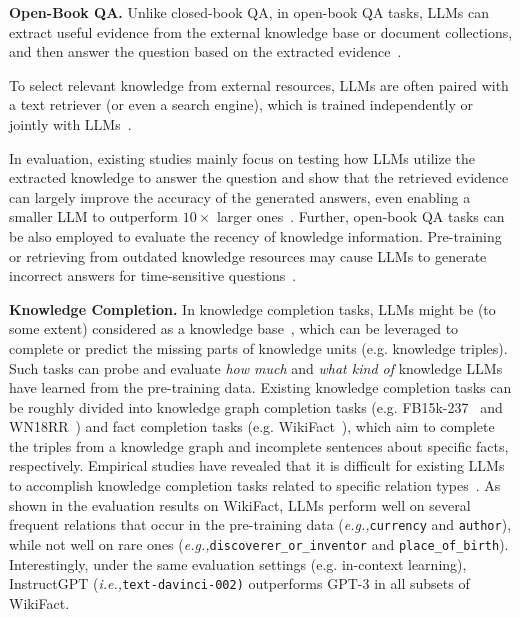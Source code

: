 {{{{{\textbf{Open-Book QA.} Unlike closed-book QA, in open-book QA tasks, LLMs can extract useful evidence from the external knowledge base or document collections,  and then answer the question based on the extracted evidence~\cite{Izacard-arxiv-2022-Few, Guu-ICML-2020-Retrieval, Lewis-NeurIPS-2020-Retrieval,Lan-2021-arxiv-Complex}. 

To select relevant knowledge from external resources, LLMs are often paired with a text retriever (or even a  search engine), which is trained independently or jointly with LLMs~\cite{Izacard-arxiv-2022-Few,Borgeaud-icml-2022-Improving,Nakano-arxiv-2021-WebGPT}. 

In evaluation, existing studies mainly focus on testing how LLMs utilize the extracted knowledge to answer the question and show that the retrieved evidence can largely improve the accuracy of the generated answers, even enabling a smaller LLM to outperform $10\times$ larger ones~\cite{Izacard-arxiv-2022-Few,Borgeaud-icml-2022-Improving}. Further, open-book QA tasks can be also employed to evaluate the recency of  knowledge information. Pre-training or retrieving from outdated knowledge resources may cause LLMs to generate incorrect answers for time-sensitive  questions~\cite{Izacard-arxiv-2022-Few}.

\textbf{Knowledge Completion.} In knowledge completion tasks, LLMs might be (to some extent) considered as a knowledge base~\cite{Petroni-EMNLP-2019-Language}, which can be leveraged to complete or predict the missing parts of knowledge units (e.g. knowledge triples). Such tasks can probe and evaluate \emph{how much} and \emph{what kind of} knowledge LLMs have learned from the pre-training data. Existing knowledge completion tasks can be roughly divided into knowledge graph completion tasks (e.g. FB15k-237~\cite{Toutanova-CVSC-2015-Observed} and  WN18RR~\cite{Dettmers-AAAI-2018-Convolutional}) and fact completion tasks (e.g. WikiFact~\cite{Goodrich-KDD-2019-Assessing}), which aim to complete the triples from a knowledge graph and incomplete sentences about specific facts, respectively. Empirical studies have revealed that it is difficult for existing LLMs to accomplish knowledge completion tasks {related to specific relation types~\cite{Liang-arxiv-2022-Holistic}.} As shown in the evaluation results on WikiFact, LLMs perform well on several frequent relations that occur in the pre-training data (\emph{e.g.,}\texttt{currency} and \texttt{author}), while not well on rare ones (\emph{e.g.,}\texttt{discoverer\_or\_inventor} and \texttt{place\_of\_birth}). 
Interestingly, 
{under the same evaluation settings (e.g. in-context learning), InstructGPT (\emph{i.e.,}\texttt{text-davinci-002)}} outperforms GPT-3 in all subsets of WikiFact.

}}}}}
